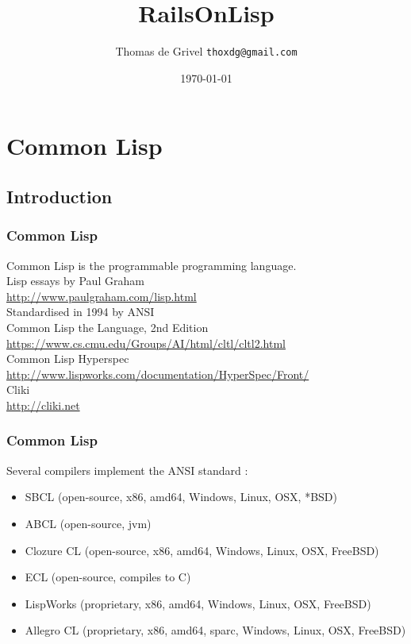 \documentclass[8pt]{beamer}
\title{RailsOnLisp}
\author{Thomas de Grivel {\tt thoxdg@gmail.com}}
\institute{http://kmx.io}
\date{\today}
\begin{document}
\begin{frame}
\titlepage
\end{frame}

\section{Common Lisp}
\subsection{Introduction}

\begin{frame}
  \frametitle{Common Lisp}
  Common Lisp is the programmable programming language. \\
  \vspace{1em}
  Lisp essays by Paul Graham \\
  \url{http://www.paulgraham.com/lisp.html} \\
  \vspace{1em}
  Standardised in 1994 by ANSI \\
  \vspace{1em}
  Common Lisp the Language, 2nd Edition \\
  \url{https://www.cs.cmu.edu/Groups/AI/html/cltl/cltl2.html} \\
  \vspace{1em}
  Common Lisp Hyperspec \\
  \url{http://www.lispworks.com/documentation/HyperSpec/Front/} \\
  \vspace{1em}
  Cliki \\
  \url{http://cliki.net}
\end{frame}

\begin{frame}
  \frametitle{Common Lisp}
  Several compilers implement the ANSI standard :
  \begin{itemize}
  \item SBCL (open-source, x86, amd64, Windows, Linux, OSX, *BSD)
  \item ABCL (open-source, jvm)
  \item Clozure CL (open-source, x86, amd64, Windows, Linux, OSX, FreeBSD)
  \item ECL (open-source, compiles to C)
  \item LispWorks (proprietary, x86, amd64, Windows, Linux, OSX, FreeBSD)
  \item Allegro CL (proprietary, x86, amd64, sparc, Windows, Linux, OSX, FreeBSD)
  \end{itemize}
\end{frame}
\end{document}
